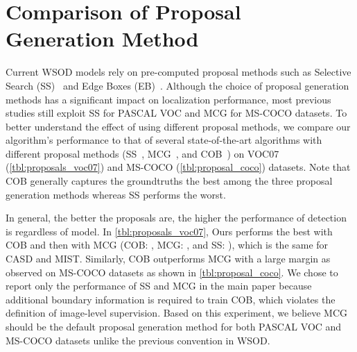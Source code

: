 \documentclass[runningheads]{llncs}
\begin{document}
\clearpage
\section{Comparison of Proposal Generation Method}
\label{sec:performance_proposal_generations}
Current WSOD models rely on pre-computed proposal methods such as Selective Search (SS)~\cite{uijlings2013selective} and Edge Boxes (EB)~\cite{zitnick2014edge}.
Although the choice of proposal generation methods has a significant impact on localization performance,
most previous studies still exploit SS for PASCAL VOC and MCG for MS-COCO datasets.
To better understand the effect of using different proposal methods, we compare our algorithm's performance to that of several state-of-the-art algorithms with different proposal methods (SS~\cite{uijlings2013selective}, MCG~\cite{arbelaez2014multiscale}, and COB~\cite{maninis2016convolutional}) on VOC07 (\cref{tbl:proposals_voc07}) and MS-COCO (\cref{tbl:proposal_coco}) datasets.
Note that COB generally captures the groundtruths the best among the three proposal generation methods whereas SS performs the worst.

In general, the better the proposals are, the higher the performance of detection is regardless of model.
In \cref{tbl:proposals_voc07}, Ours performs the best with COB and then with MCG (COB: , MCG: , and SS: ), which is the same for CASD and MIST.
Similarly, COB outperforms MCG with a large margin as observed on MS-COCO datasets as shown in \cref{tbl:proposal_coco}.
We chose to report only the performance of SS and MCG in the main paper because additional boundary information is required to train COB, which violates the definition of image-level supervision.
Based on this experiment, we believe MCG should be the default proposal generation method for both PASCAL VOC and MS-COCO datasets unlike the previous convention in WSOD.
\end{document}
